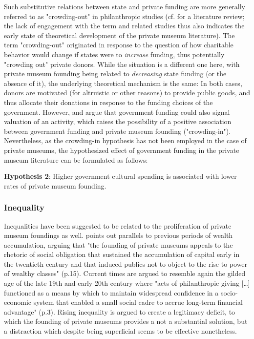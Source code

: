 \documentclass[11pt]{article}
\begin{document}
Such substitutive relations between state and private funding are more generally referred to as "crowding-out" in philanthropic studies (cf. \cite{Bekkers_Wiepking_2010_literature} for a literature review;  the lack of engagement with the term and related studies thus also indicates the early state of theoretical development of the private museum literature).
The term "crowding-out" originated in response to the question of how charitable behavior would change if states were to \emph{increase} funding, thus potentially "crowding out" private donors.
While the situation is a different one here, with private museum founding being related to \emph{decreasing} state funding (or the absence of it), the underlying theoretical mechanism is the same:
In both cases, donors are motivated (for altruistic or other reasons) to provide public goods, and thus allocate their donations in response to the funding choices of the government.
However, \textcite{DeWit_etal_2018_philanthropy} and \textcite{Lena_2019_entitled} argue that government funding could also signal valuation of an activity, which raises the possibility of a positive association between government funding and private museum founding ("crowding-in").
Nevertheless, as the crowding-in hypothesis has not been employed in the case of private museums, the hypothesized effect of government funding in the private museum literature can be formulated as follows:  

\bigbreak
\noindent
\textbf{Hypothesis 2}: Higher government cultural spending is associated with lower rates of private museum founding.


\subsubsection*{Inequality}


Inequalities have been suggested to be related to the proliferation of private museum foundings as well. 
\textcite{Brown_2019_private} points out parallels to previous periods of wealth accumulation, arguing that "the founding of private museums appeals to the rhetoric of social obligation that sustained the accumulation of capital early in the twentieth century and that induced publics not to object to the rise to power of wealthy classes" (p.15).
Current times are argued to resemble again the gilded age of the late 19th and early 20th century where "acts of philanthropic giving [\ldots{}] functioned as a means by which to maintain widespread confidence in a socio-economic system that enabled a small social cadre to accrue long-term financial advantage" (p.3). 
Rising inequality is argued to create a legitimacy deficit, to which the founding of private museums provides a not a substantial solution, but a distraction which despite being superficial seems to be effective nonetheless.
\end{document}
